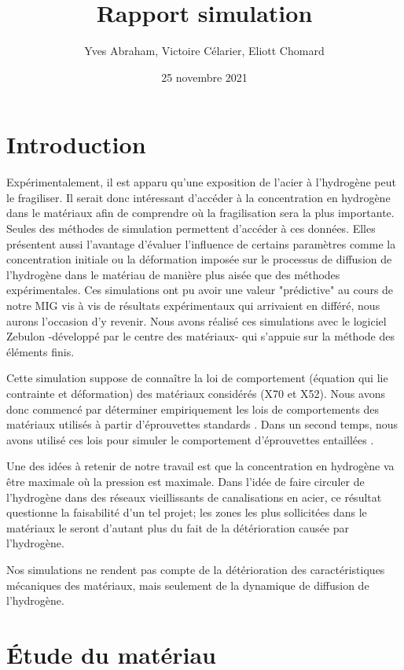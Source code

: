 \documentclass[a4paper, french, 11pt]{article}
\title{Rapport simulation}
\author{Yves Abraham, Victoire Célarier, Eliott Chomard}
\date{25 novembre 2021}
\newcommand{\nuance}[1]{\og #1 \fg}
\begin{document}
    \maketitle
    \section*{Introduction}
    Expérimentalement, il est apparu qu'une exposition de l'acier à l'hydrogène peut le fragiliser. Il serait donc intéressant d'accéder à la concentration en hydrogène dans le matériaux afin de comprendre où la fragilisation sera la plus importante. 
    Seules des méthodes de simulation permettent \og d'accéder \fg à ces données. Elles présentent aussi l'avantage d'évaluer l'influence de certains paramètres comme la concentration initiale ou la déformation imposée sur le processus de diffusion de l'hydrogène dans le matériau de manière plus aisée que des méthodes expérimentales.
    Ces simulations ont pu avoir une valeur "prédictive" au cours de notre MIG vis à vis de résultats expérimentaux qui arrivaient en différé, nous aurons l'occasion d'y revenir.
    Nous avons réalisé ces simulations avec le logiciel Zebulon -développé par le centre des matériaux- qui s'appuie sur la méthode des éléments finis.

    Cette simulation suppose de connaître la loi de comportement (équation qui lie contrainte et déformation) des matériaux considérés (X70 et X52). Nous avons donc commencé par déterminer empiriquement les lois de comportements des matériaux utilisés à partir d'éprouvettes \nuance{standards}. Dans un second temps, nous avons utilisé ces lois pour simuler le comportement d'éprouvettes \nuance{entaillées}.

    Une des idées à retenir de notre travail est que la concentration en hydrogène va être maximale où la pression est maximale. Dans l'idée de faire circuler de l'hydrogène dans des réseaux \nuance{vieillissants} de canalisations en acier, ce résultat questionne la faisabilité d'un tel projet; les zones les plus sollicitées dans le matériaux le seront d'autant plus du fait de la détérioration causée par l'hydrogène.

    Nos simulations ne rendent pas compte de la détérioration des caractéristiques mécaniques des matériaux, mais seulement de la dynamique de diffusion de l'hydrogène.

    \section{Étude du matériau}
\end{document}
